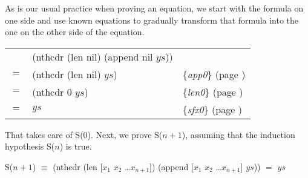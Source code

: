 As is our usual practice when proving an equation,
we start with the formula on one side and use known
equations to gradually transform that formula
into the one on the other side of the equation.

\begin{center}
\begin{tabular}{lll}
    & (nthcdr (len nil) (append nil $ys$))  &                                                  \\
$=$ & (nthcdr (len nil) $ys$)               & \{\emph{app0}\} (page \pageref{fig:append-defun})\\
$=$ & (nthcdr 0 $ys$)                       & \{\emph{len0}\} (page \pageref{len-equations})   \\
$=$ & $ys$                                  & \{\emph{sfx0}\} (page \pageref{fig:nthcdr-defun})\\
\end{tabular}
\end{center}

That takes care of S(0). Next, we prove S($n+1$), assuming that
the induction hypothesis S($n$) is true.

\begin{samepage}
\begin{center}
S($n+1$) $\equiv$ (nthcdr (len [$x_1$ $x_2$ \dots $x_{n+1}$]) (append [$x_1$ $x_2$ \dots $x_{n+1}$] $ys$)) $=$ $ys$
\end{center}
\end{samepage}

